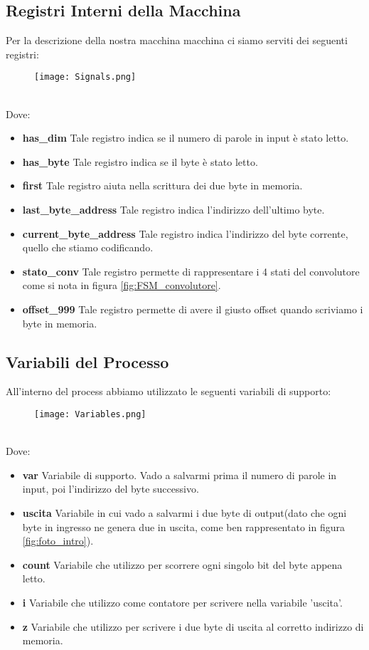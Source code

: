 \documentclass[a4paper]{article}
\begin{document}
\subsection{Registri Interni della Macchina}
Per la descrizione della nostra macchina macchina ci siamo serviti dei seguenti registri:
\begin{figure}[htp]
    \centering
    \texttt{[image: Signals.png]}
    \label{fig:signals}
\end{figure}
\\
%
Dove:
\begin{itemize}
    \item \textbf{has\_dim} Tale registro indica se il numero di parole in input è stato letto.
    \item \textbf{has\_byte} Tale registro indica se il byte è stato letto.
    \item \textbf{first} Tale registro aiuta nella scrittura dei due byte in memoria.
    \item \textbf{last\_byte\_address} Tale registro indica l'indirizzo dell'ultimo byte.
    \item \textbf{current\_byte\_address} Tale registro indica l'indirizzo del byte corrente, quello che stiamo codificando.
    \item \textbf{stato\_conv} Tale registro permette di rappresentare i 4 stati del convolutore come si nota in figura \ref{fig:FSM_convolutore}.
    \item \textbf{offset\_999} Tale registro permette di avere il giusto offset quando scriviamo i byte in memoria.

\end{itemize}

\subsection{Variabili del Processo}
All'interno del process abbiamo utilizzato le seguenti variabili di supporto:
\begin{figure}[htp]
    \centering
    \texttt{[image: Variables.png]}
    \label{fig:variables}
\end{figure}
\\
%
Dove:
\begin{itemize}
    \item \textbf{var} Variabile di supporto. Vado a salvarmi prima il numero di parole in input, poi l'indirizzo del byte successivo.
    \item \textbf{uscita} Variabile in cui vado a salvarmi i due byte di output(dato che ogni byte in ingresso ne genera due in uscita, come ben rappresentato in figura \ref{fig:foto_intro}).
    \item \textbf{count} Variabile che utilizzo per scorrere ogni singolo bit del byte appena letto.
    \item \textbf{i} Variabile che utilizzo come contatore per scrivere nella variabile 'uscita'.
    \item \textbf{z} Variabile che utilizzo per scrivere i due byte di uscita al corretto indirizzo di memoria.

\end{itemize}
\end{document}
